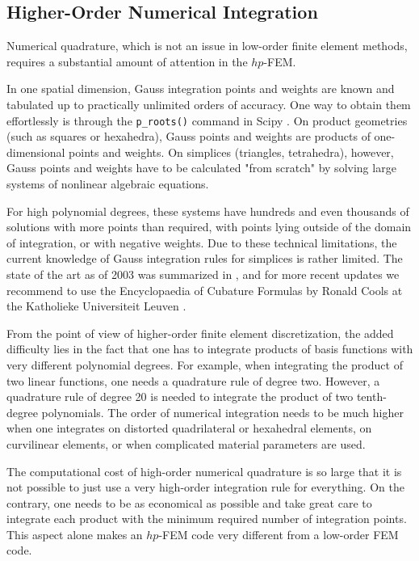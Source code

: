 \documentclass[final,3p,times,twocolumn]{elsarticle}
\begin{document}
\subsection{Higher-Order Numerical Integration}

Numerical quadrature, which is not an issue
in low-order finite element methods, requires a substantial 
amount of attention in the $hp$-FEM.

In one spatial dimension, Gauss integration points
and weights are known and tabulated up to practically 
unlimited orders of accuracy. One way to obtain them 
effortlessly is through the {\tt p\_roots()} command
in Scipy \cite{scipy}. On product geometries (such
as squares or hexahedra), Gauss points and weights 
are products of one-dimensional points and weights.
On simplices (triangles, tetrahedra), however,
Gauss points and weights have to be calculated 
"from scratch" by solving large systems of nonlinear 
algebraic equations. 

For high polynomial degrees, these systems have hundreds
and even thousands of solutions with more points than required, with points 
lying outside of the domain of integration, or with 
negative weights. Due to these technical limitations, the current 
knowledge of Gauss
integration rules for simplices is rather limited. 
The state of the art as of 2003 was summarized 
in \cite{sosedo}, and for more recent updates we recommend
to use the Encyclopaedia of Cubature Formulas by Ronald 
Cools at the Katholieke Universiteit Leuven \cite{cools}.

From the point of view of higher-order finite element
discretization, the added difficulty lies in the 
fact that one has to integrate products of basis functions
with very different polynomial degrees. For example, 
when integrating the product of two linear functions,
one needs a quadrature rule of degree two. However, 
a quadrature rule of degree 20 is needed to integrate 
the product of two tenth-degree polynomials. The order 
of numerical integration needs to be much higher when 
one integrates on distorted quadrilateral or hexahedral 
elements, on curvilinear elements, or when complicated
material parameters are used.  

The computational cost of high-order numerical quadrature 
is so large that it is not possible to just use
a very high-order integration rule for everything. On the 
contrary, one needs to be as economical as possible and 
take great care to integrate each product with the minimum 
required number of integration points. This aspect alone 
makes an $hp$-FEM code very different from a low-order FEM 
code. 
\end{document}
